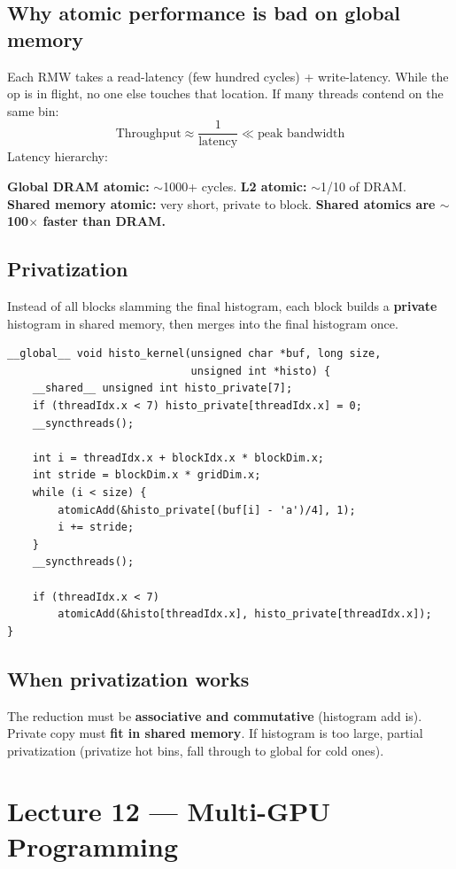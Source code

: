 \documentclass[10pt]{article}
\begin{document}
\subsection*{Why atomic performance is bad on global memory}
Each RMW takes a read-latency (few hundred cycles) + write-latency. While the op is in flight, no one else touches that location. If many threads contend on the same bin:
\[
\text{Throughput} \approx \frac{1}{\text{latency}} \ll \text{peak bandwidth}
\]
Latency hierarchy:
\begin{keybox}
\textbf{Global DRAM atomic:} $\sim$1000+ cycles. \textbf{L2 atomic:} $\sim$1/10 of DRAM. \textbf{Shared memory atomic:} very short, private to block. \textbf{Shared atomics are $\sim$100$\times$ faster than DRAM.}
\end{keybox}

\subsection*{Privatization}
Instead of all blocks slamming the final histogram, each block builds a \textbf{private} histogram in shared memory, then merges into the final histogram once.

\begin{lstlisting}
__global__ void histo_kernel(unsigned char *buf, long size,
                             unsigned int *histo) {
    __shared__ unsigned int histo_private[7];
    if (threadIdx.x < 7) histo_private[threadIdx.x] = 0;
    __syncthreads();

    int i = threadIdx.x + blockIdx.x * blockDim.x;
    int stride = blockDim.x * gridDim.x;
    while (i < size) {
        atomicAdd(&histo_private[(buf[i] - 'a')/4], 1);
        i += stride;
    }
    __syncthreads();

    if (threadIdx.x < 7)
        atomicAdd(&histo[threadIdx.x], histo_private[threadIdx.x]);
}
\end{lstlisting}

\subsection*{When privatization works}
The reduction must be \textbf{associative and commutative} (histogram add is). Private copy must \textbf{fit in shared memory}. If histogram is too large, partial privatization (privatize hot bins, fall through to global for cold ones).

\hrulefill

\section{Lecture 12 — Multi-GPU Programming}
\end{document}
